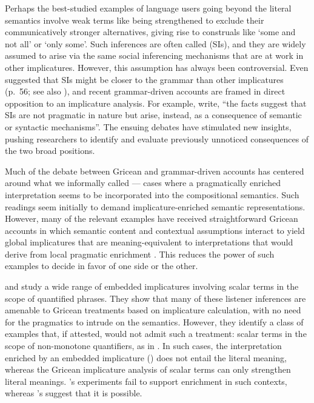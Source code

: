 \documentclass[leqno,12pt]{article}
\begin{document}
Perhaps the best-studied examples of language users going beyond the
literal semantics involve weak terms like  being
strengthened to exclude their communicatively stronger alternatives,
giving rise to construals like `some and not all' or `only some'.
Such inferences are often called  (SIs), and they are widely assumed to arise via the
same social inferencing mechanisms that are at work in other
implicatures.  However, this assumption has always been
controversial. Even \citeauthor{Grice75} suggested that SIs might be
closer to the grammar than other implicatures (p.~56; see also
\citealt{Levinson00,Sperber95,Bach06}), and recent grammar-driven
accounts are framed in direct opposition to an implicature analysis.
For example,  write, ``the facts
suggest that SIs are not pragmatic in nature but arise, instead, as a
consequence of semantic or syntactic mechanisms''. The ensuing debates
have stimulated new insights, pushing researchers to identify and
evaluate previously unnoticed consequences of the two broad positions.

Much of the debate between Gricean and grammar-driven accounts has
centered around what we informally called 
--- cases where a pragmatically enriched interpretation seems to be
incorporated into the compositional semantics. Such readings seem
initially to demand implicature-enriched semantic representations.
However, many of the relevant examples have received straightforward
Gricean accounts in which semantic content and contextual assumptions
interact to yield global implicatures that are meaning-equivalent to
interpretations that would derive from local pragmatic enrichment
\citep{Russell06,Geurts09}. This reduces the power of such examples to
decide in favor of one side or the other.


\citet{Geurts:Pouscoulous:2009} and \citet{Chemla:Spector:2011} study
a wide range of embedded implicatures involving scalar terms in the
scope of quantified phrases. They show that many of these listener
inferences are amenable to Gricean treatments based on implicature
calculation, with no need for the pragmatics to intrude on the
semantics. However, they identify a class of examples that, if
attested, would not admit such a treatment: scalar terms in the scope
of non-monotone quantifiers, as in . In such cases, the interpretation enriched by an
embedded implicature ()
does not entail the literal meaning, whereas the Gricean implicature
analysis of scalar terms can only strengthen literal
meanings. \citeauthor{Geurts:Pouscoulous:2009}'s experiments fail to
support enrichment in such contexts, whereas
\citeauthor{Chemla:Spector:2011}'s suggest that it is possible.
\end{document}
